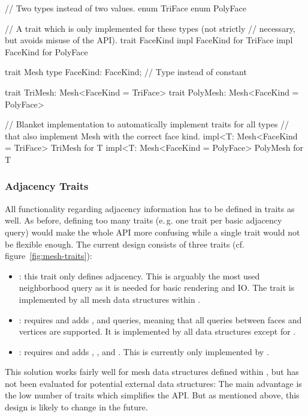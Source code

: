 \begin{rustcode}
  // Two types instead of two values.
  enum TriFace {}
  enum PolyFace {}

  // A trait which is only implemented for these types (not strictly
  // necessary, but avoids misuse of the API).
  trait FaceKind {}
  impl FaceKind for TriFace {}
  impl FaceKind for PolyFace {}

  trait Mesh {
      type FaceKind: FaceKind;  // Type instead of constant
  }

  trait TriMesh: Mesh<FaceKind = TriFace> {}
  trait PolyMesh: Mesh<FaceKind = PolyFace> {}

  // Blanket implementation to automatically implement traits for all types
  // that also implement Mesh with the correct face kind.
  impl<T: Mesh<FaceKind = TriFace> TriMesh for T {}
  impl<T: Mesh<FaceKind = PolyFace> PolyMesh for T {}
\end{rustcode}


\subsubsection*{Adjacency Traits}

All functionality regarding adjacency information has to be defined in traits as well.
As before, defining too many traits (e.\,g. one trait per basic adjacency query) would make the whole API more confusing while a single trait would not be flexible enough.
The current design consists of three traits (cf. figure~\ref{fig:mesh-traits}):

\begin{itemize}
  \item \textbf{}: this trait only defines  adjacency.
  This is arguably the most used neighborhood query as it is needed for basic rendering and IO.
  The trait is implemented by all mesh data structures within .
  \item \textbf{}: requires  and adds ,  and  queries, meaning that all queries between faces and vertices are supported.
  It is implemented by all data structures except for .
  \item \textbf{}: requires  and adds , ,  and .
  This is currently only implemented by .
\end{itemize}

This solution works fairly well for mesh data structures defined within , but has not been evaluated for potential external data structures:
The main advantage is the low number of traits which simplifies the API.
But as mentioned above, this design is likely to change in the future.


